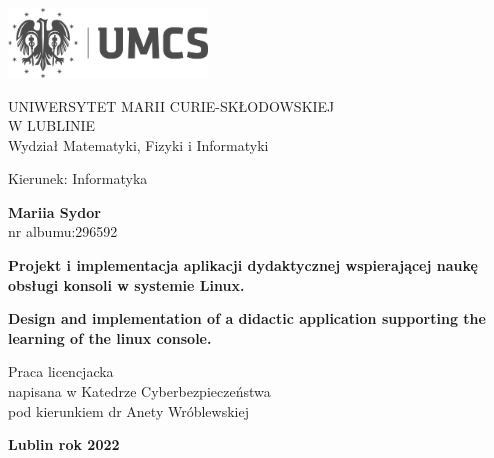\documentclass[10pt,a4paper]{report}
\begin{document}
\begin{flushleft}
\includegraphics[width=200px]{img/UMCS_skrocone_12G_PL_gray}

\vspace{1cm}
\begin{adjustwidth}{1.5in}{0cm}
\LARGE 
UNIWERSYTET MARII CURIE-SKŁODOWSKIEJ \\ W LUBLINIE \\
Wydział Matematyki, Fizyki i Informatyki
\end{adjustwidth}

\vspace{1cm}
\begin{adjustwidth}{1.2in}{0cm}

\begin{mdframed}[linewidth=0.5, topline=false,rightline=false,bottomline=false]
\large 
\vspace{0.5cm}
 Kierunek: Informatyka 
 
 \vspace{1cm}
 
 \textbf{Mariia Sydor} \\ 
 nr albumu:296592 
 
 \vspace{3cm}
 \Large
 \textbf{Projekt i implementacja aplikacji dydaktycznej wspierającej naukę obsługi konsoli 
 w systemie Linux.} \\

\vspace{0.5cm}

\large 
\textbf{Design and implementation of a didactic application supporting the \\ learning of the linux console.} 
\vspace{3cm}
 
 Praca licencjacka \\
 napisana w Katedrze Cyberbezpieczeństwa \\
 pod kierunkiem dr Anety Wróblewskiej
 \vspace{0.5cm}
 
\end{mdframed}

\vspace{1cm}
\begin{adjustwidth}{0.5cm}{0cm}
\textbf{Lublin  rok 2022}
\end{adjustwidth}
\thispagestyle{empty}
\end{adjustwidth}
\end{flushleft}
\end{document}
